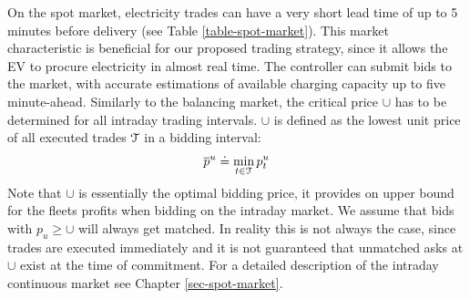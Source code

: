 \documentclass[a4paper, 12pt]{article}
\begin{document}
On the spot market, electricity trades can have a very short lead time of up to
5 minutes before delivery (see Table \ref{table-spot-market}). This market
characteristic is beneficial for our proposed trading strategy, since it allows
the EV to procure electricity in almost real time. The controller can submit
bids to the market, with accurate estimations of available charging capacity up
to five minute-ahead. Similarly to the balancing market, the critical price
\(\cup{}\) has to be determined for all intraday trading intervals.
\(\cup{}\) is defined as the lowest unit price of all executed trades
\(\cal{T}\) in a bidding interval:
\begin{equation*}
    \overline p^u_{} \doteq \min_{t \in \cal{T}} p^u_{t}
\end{equation*}
Note that \(\cup{}\) is essentially the optimal bidding price, it provides
on upper bound for the fleets profits when bidding on the intraday market. We
assume that bids with  \(p_u \geq \cup{}\) will always get matched. In
reality this is not always the case, since trades are executed immediately and
it is not guaranteed that unmatched asks at \(\cup{}\) exist at the time
of commitment. For a detailed description of the intraday continuous market see
Chapter \ref{sec-spot-market}.
\end{document}
